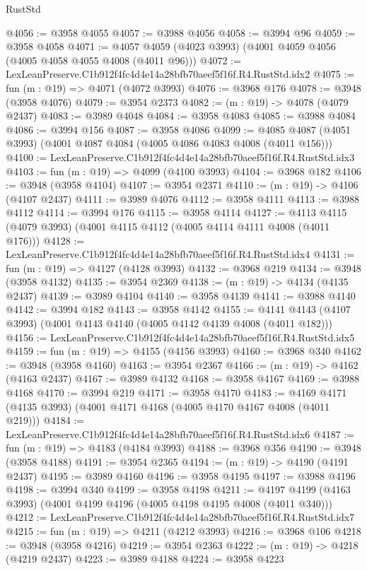 \begin{lexlean}{RustStd}
\begin{coremodule}
@4056 := @3958 @4055
@4057 := @3988 @4056
@4058 := @3994 @96
@4059 := @3958 @4058
@4071 := @4057 @4059 (@4023 @3993) (@4001 @4059 @4056 (@4005 @4058 @4055 @4008 (@4011 @96)))
@4072 := LexLeanPreserve.C1b912f4fc4d4e14a28bfb70aeef5f16f.R4.RustStd.idx2
@4075 := fun (m : @19) => @4071 (@4072 @3993)
@4076 := @3968 @176
@4078 := @3948 (@3958 @4076)
@4079 := @3954 @2373
@4082 := (m : @19) -> @4078 (@4079 @2437)
@4083 := @3989 @4048
@4084 := @3958 @4083
@4085 := @3988 @4084
@4086 := @3994 @156
@4087 := @3958 @4086
@4099 := @4085 @4087 (@4051 @3993) (@4001 @4087 @4084 (@4005 @4086 @4083 @4008 (@4011 @156)))
@4100 := LexLeanPreserve.C1b912f4fc4d4e14a28bfb70aeef5f16f.R4.RustStd.idx3
@4103 := fun (m : @19) => @4099 (@4100 @3993)
@4104 := @3968 @182
@4106 := @3948 (@3958 @4104)
@4107 := @3954 @2371
@4110 := (m : @19) -> @4106 (@4107 @2437)
@4111 := @3989 @4076
@4112 := @3958 @4111
@4113 := @3988 @4112
@4114 := @3994 @176
@4115 := @3958 @4114
@4127 := @4113 @4115 (@4079 @3993) (@4001 @4115 @4112 (@4005 @4114 @4111 @4008 (@4011 @176)))
@4128 := LexLeanPreserve.C1b912f4fc4d4e14a28bfb70aeef5f16f.R4.RustStd.idx4
@4131 := fun (m : @19) => @4127 (@4128 @3993)
@4132 := @3968 @219
@4134 := @3948 (@3958 @4132)
@4135 := @3954 @2369
@4138 := (m : @19) -> @4134 (@4135 @2437)
@4139 := @3989 @4104
@4140 := @3958 @4139
@4141 := @3988 @4140
@4142 := @3994 @182
@4143 := @3958 @4142
@4155 := @4141 @4143 (@4107 @3993) (@4001 @4143 @4140 (@4005 @4142 @4139 @4008 (@4011 @182)))
@4156 := LexLeanPreserve.C1b912f4fc4d4e14a28bfb70aeef5f16f.R4.RustStd.idx5
@4159 := fun (m : @19) => @4155 (@4156 @3993)
@4160 := @3968 @340
@4162 := @3948 (@3958 @4160)
@4163 := @3954 @2367
@4166 := (m : @19) -> @4162 (@4163 @2437)
@4167 := @3989 @4132
@4168 := @3958 @4167
@4169 := @3988 @4168
@4170 := @3994 @219
@4171 := @3958 @4170
@4183 := @4169 @4171 (@4135 @3993) (@4001 @4171 @4168 (@4005 @4170 @4167 @4008 (@4011 @219)))
@4184 := LexLeanPreserve.C1b912f4fc4d4e14a28bfb70aeef5f16f.R4.RustStd.idx6
@4187 := fun (m : @19) => @4183 (@4184 @3993)
@4188 := @3968 @356
@4190 := @3948 (@3958 @4188)
@4191 := @3954 @2365
@4194 := (m : @19) -> @4190 (@4191 @2437)
@4195 := @3989 @4160
@4196 := @3958 @4195
@4197 := @3988 @4196
@4198 := @3994 @340
@4199 := @3958 @4198
@4211 := @4197 @4199 (@4163 @3993) (@4001 @4199 @4196 (@4005 @4198 @4195 @4008 (@4011 @340)))
@4212 := LexLeanPreserve.C1b912f4fc4d4e14a28bfb70aeef5f16f.R4.RustStd.idx7
@4215 := fun (m : @19) => @4211 (@4212 @3993)
@4216 := @3968 @106
@4218 := @3948 (@3958 @4216)
@4219 := @3954 @2363
@4222 := (m : @19) -> @4218 (@4219 @2437)
@4223 := @3989 @4188
@4224 := @3958 @4223

\end{coremodule}
\end{lexlean}
